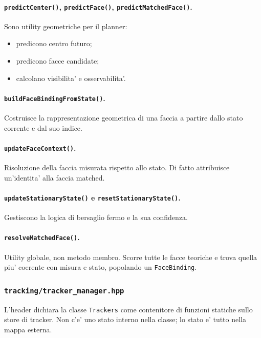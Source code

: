 \documentclass[11pt,a4paper]{article}
\newcommand{\code}[1]{\texttt{#1}}
\begin{document}
\paragraph{\code{predictCenter()}, \code{predictFace()}, \code{predictMatchedFace()}.}
Sono utility geometriche per il planner:
\begin{itemize}[leftmargin=1.4em]
  \item predicono centro futuro;
  \item predicono facce candidate;
  \item calcolano visibilita' e osservabilita'.
\end{itemize}

\paragraph{\code{buildFaceBindingFromState()}.}
Costruisce la rappresentazione geometrica di una faccia a partire dallo stato corrente e dal suo indice.

\paragraph{\code{updateFaceContext()}.}
Risoluzione della faccia misurata rispetto allo stato. Di fatto attribuisce un'identita' alla faccia matched.

\paragraph{\code{updateStationaryState()} e \code{resetStationaryState()}.}
Gestiscono la logica di bersaglio fermo e la sua confidenza.

\paragraph{\code{resolveMatchedFace()}.}
Utility globale, non metodo membro. Scorre tutte le facce teoriche e trova quella piu' coerente con misura e stato, popolando un \code{FaceBinding}.

\subsubsection{\code{tracking/tracker\_manager.hpp}}

L'header dichiara la classe \code{Trackers} come contenitore di funzioni statiche sullo store di tracker. Non c'e' uno stato interno nella classe; lo stato e' tutto nella mappa esterna.
\end{document}

